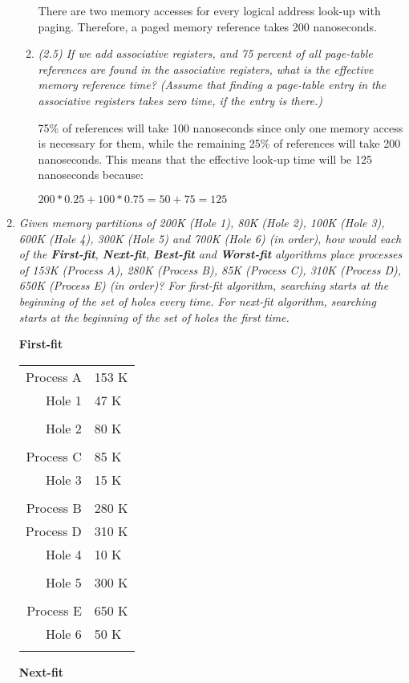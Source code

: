 \documentclass[letterpaper,11pt]{article}
\begin{document}
\begin{enumerate}
\begin{enumerate}
    There are two memory accesses for every logical address look-up with paging.  Therefore, a paged memory reference takes 200 nanoseconds.
    \item \emph{(2.5) If we add associative registers, and 75 percent of all page-table references are found in the associative registers, what is the effective memory reference time? (Assume that finding a page-table entry in the associative registers takes zero time, if the entry is there.)}

    75\% of references will take 100 nanoseconds since only one memory access is necessary for them, while the remaining 25\% of references will take 200 nanoseconds.  This means that the effective look-up time will be 125 nanoseconds because:
    
    $200 * 0.25 + 100 * 0.75 = 50 + 75 = 125$
  \end{enumerate}
\item \textit{Given memory partitions of 200K (Hole 1), 80K (Hole 2), 100K (Hole 3), 600K (Hole 4), 300K (Hole 5) and 700K (Hole 6) (in order), how would each of the \textbf{First-fit}, \textbf{Next-fit}, \textbf{Best-fit} and \textbf{Worst-fit} algorithms place processes of 153K (Process A), 280K (Process B), 85K (Process C), 310K (Process D), 650K (Process E) (in order)? For first-fit algorithm, searching starts at the beginning of the set of holes every time. For next-fit algorithm, searching starts at the beginning of the set of holes the first time.}

\begin{minipage}[t]{0.22\textwidth}
\textbf{First-fit}

  \begin{tabular}{| r  l |}
    \hline
    \rowcolor{gray}
     & \\ \hline
    Process A & 153 K \\ \hline
    Hole 1 & 47 K \\ \hline
    \rowcolor{gray}
     & \\ \hline
    Hole 2 & 80 K \\ \hline
    \rowcolor{gray}
     & \\ \hline
    Process C & 85 K \\ \hline
    Hole 3 & 15 K \\ \hline
    \rowcolor{gray}
     & \\ \hline
    Process B & 280 K \\ \hline
    Process D & 310 K \\ \hline
    Hole 4 & 10 K \\ \hline
    \rowcolor{gray}
     & \\ \hline
    Hole 5 & 300 K \\ \hline
    \rowcolor{gray}
     & \\ \hline
    Process E & 650 K \\ \hline
    Hole 6 & 50 K \\ \hline
    \rowcolor{gray}
     & \\ \hline
  \end{tabular}
\end{minipage}
\begin{minipage}[t]{0.22\textwidth}
\textbf{Next-fit}


\end{minipage}
\end{enumerate}
\end{document}
